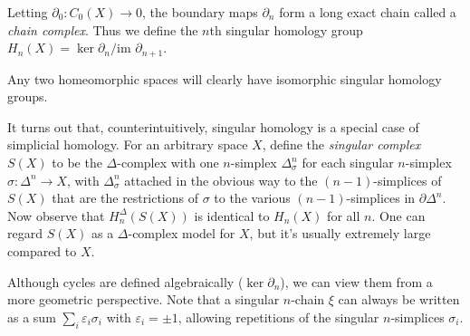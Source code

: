 \documentclass[a4paper]{article}
\begin{document}
Letting $\partial_0 : C_0(X) \to 0$, the boundary maps $\partial_n$ form a long exact chain called a \emph{chain complex}. Thus we define the $n$th singular homology group $H_n(X) = \ker \partial_n / \text{im } \partial_{n+1}$.

Any two homeomorphic spaces will clearly have isomorphic singular homology groups.

It turns out that, counterintuitively, singular homology is a special case of simplicial homology. For an arbitrary space $X$, define the \emph{singular complex} $S(X)$ to be the $\Delta$-complex with one $n$-simplex $\Delta_\sigma^n$ for each singular $n$-simplex $\sigma : \Delta^n \to X$, with $\Delta_\sigma^n$ attached in the obvious way to the $(n-1)$-simplices of $S(X)$ that are the restrictions of $\sigma$ to the various $(n-1)$-simplices in $\partial \Delta^n$. Now observe that $H_n^\Delta(S(X))$ is identical to $H_n(X)$ for all $n$. One can regard $S(X)$ as a $\Delta$-complex model for $X$, but it's usually extremely large compared to $X$.

Although cycles are defined algebraically ($\ker \partial_n$), we can view them from a more geometric perspective. Note that a singular $n$-chain $\xi$ can always be written as a sum $\sum_i \varepsilon_i\sigma_i$ with $\varepsilon_i = \pm 1$, allowing repetitions of the singular $n$-simplices $\sigma_i$.
\end{document}
